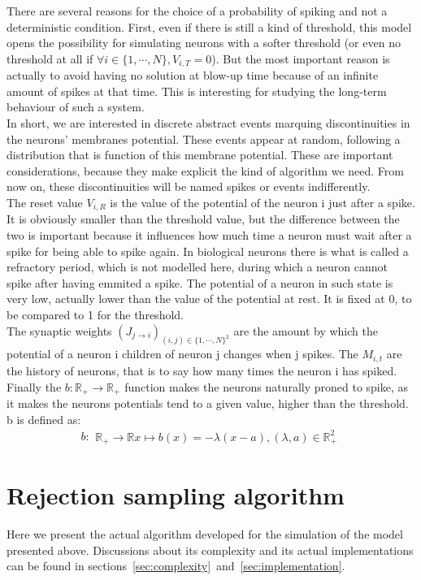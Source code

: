 	There are several reasons for the choice of a probability of spiking and not a deterministic condition. First, even if there is still a kind of threshold, this model opens the possibility for simulating neurons with a softer threshold (or even no threshold at all if $\forall i\in\{1,\cdots,N\}, V_{i,T}=0$). But the most important reason is actually to avoid having no solution at blow-up time because of an infinite amount of spikes at that time. This is interesting for studying the long-term behaviour of such a system.\\\indent
	In short, we are interested in discrete abstract events marquing discontinuities in the neurons' membranes potential. These events appear at random, following a distribution that is function of this membrane potential. These are important considerations, because they make explicit the kind of algorithm we need. From now on, these discontinuities will be named spikes or events indifferently.\\\indent
	The reset value $V_{i,R}$ is the value of the potential of the neuron i just after a spike. It is obviously smaller than the threshold value, but the difference between the two is important because it influences how much time a neuron must wait after a spike for being able to spike again. In biological neurons there is what is called a refractory period, which is not modelled here, during which a neuron cannot spike after having emmited a spike. The potential of a neuron in such state is very low, actually lower than the value of the potential at rest. It is fixed at 0, to be compared to 1 for the threshold.\\\indent
	The synaptic weights $(J_{j\to i})_{(i,j)\in\{1,\cdots,N\}^2}$ are the amount by which the potential of a neuron i children of neuron j changes when j spikes. The $M_{i,t}$ are the history of neurons, that is to say how many times the neuron i has spiked.\\\indent
	Finally the $b:\mathbb{R}_{+}\to\mathbb{R}_+$ function makes the neurons naturally proned to spike, as it makes the neurons potentials tend to a given value, higher than the threshold. b is defined as:
	\begin{equation*}
		b:	\begin{aligned}
				\mathbb{R}_+\to\mathbb{R}
				x\mapsto b(x)=-\lambda(x-a), (\lambda,a)\in\mathbb{R}_+^2
			\end{aligned}
	\end{equation*}
\section{Rejection sampling algorithm}\label{sec:rejectionsampling}
	Here we present the actual algorithm developed for the simulation of the model presented above. Discussions about its complexity and its actual implementations can be found in sections~\ref{sec:complexity}~and~\ref{sec:implementation}.\\\indent
